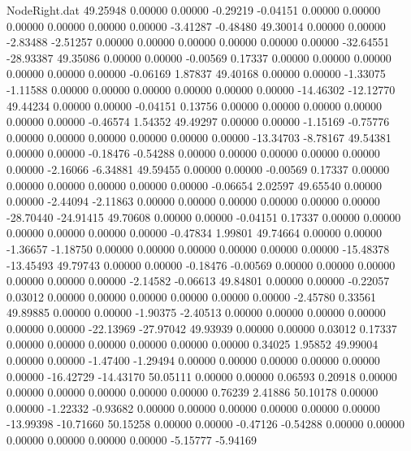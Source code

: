 \begin{filecontents}{NodeRight.dat}
  49.25948    0.00000    0.00000    -0.29219   -0.04151    0.00000    0.00000    0.00000    0.00000    0.00000    0.00000   -3.41287   -0.48480
  49.30014    0.00000    0.00000    -2.83488   -2.51257    0.00000    0.00000    0.00000    0.00000    0.00000    0.00000  -32.64551  -28.93387
  49.35086    0.00000    0.00000    -0.00569    0.17337    0.00000    0.00000    0.00000    0.00000    0.00000    0.00000   -0.06169    1.87837
  49.40168    0.00000    0.00000    -1.33075   -1.11588    0.00000    0.00000    0.00000    0.00000    0.00000    0.00000  -14.46302  -12.12770
  49.44234    0.00000    0.00000    -0.04151    0.13756    0.00000    0.00000    0.00000    0.00000    0.00000    0.00000   -0.46574    1.54352
  49.49297    0.00000    0.00000    -1.15169   -0.75776    0.00000    0.00000    0.00000    0.00000    0.00000    0.00000  -13.34703   -8.78167
  49.54381    0.00000    0.00000    -0.18476   -0.54288    0.00000    0.00000    0.00000    0.00000    0.00000    0.00000   -2.16066   -6.34881
  49.59455    0.00000    0.00000    -0.00569    0.17337    0.00000    0.00000    0.00000    0.00000    0.00000    0.00000   -0.06654    2.02597
  49.65540    0.00000    0.00000    -2.44094   -2.11863    0.00000    0.00000    0.00000    0.00000    0.00000    0.00000  -28.70440  -24.91415
  49.70608    0.00000    0.00000    -0.04151    0.17337    0.00000    0.00000    0.00000    0.00000    0.00000    0.00000   -0.47834    1.99801
  49.74664    0.00000    0.00000    -1.36657   -1.18750    0.00000    0.00000    0.00000    0.00000    0.00000    0.00000  -15.48378  -13.45493
  49.79743    0.00000    0.00000    -0.18476   -0.00569    0.00000    0.00000    0.00000    0.00000    0.00000    0.00000   -2.14582   -0.06613
  49.84801    0.00000    0.00000    -0.22057    0.03012    0.00000    0.00000    0.00000    0.00000    0.00000    0.00000   -2.45780    0.33561
  49.89885    0.00000    0.00000    -1.90375   -2.40513    0.00000    0.00000    0.00000    0.00000    0.00000    0.00000  -22.13969  -27.97042
  49.93939    0.00000    0.00000     0.03012    0.17337    0.00000    0.00000    0.00000    0.00000    0.00000    0.00000    0.34025    1.95852
  49.99004    0.00000    0.00000    -1.47400   -1.29494    0.00000    0.00000    0.00000    0.00000    0.00000    0.00000  -16.42729  -14.43170
  50.05111    0.00000    0.00000     0.06593    0.20918    0.00000    0.00000    0.00000    0.00000    0.00000    0.00000    0.76239    2.41886
  50.10178    0.00000    0.00000    -1.22332   -0.93682    0.00000    0.00000    0.00000    0.00000    0.00000    0.00000  -13.99398  -10.71660
  50.15258    0.00000    0.00000    -0.47126   -0.54288    0.00000    0.00000    0.00000    0.00000    0.00000    0.00000   -5.15777   -5.94169

\end{filecontents}
